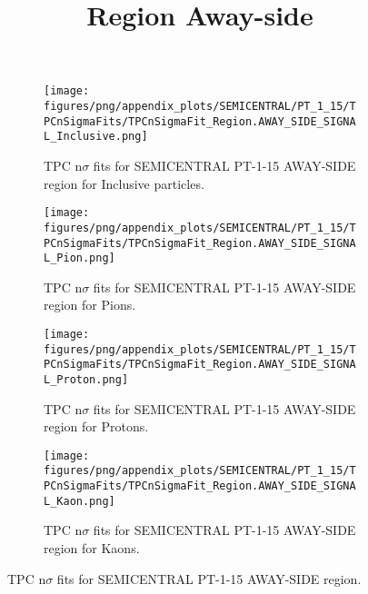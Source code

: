             \begin{figure}[H]
                \title{Region Away-side}
                \begin{subfigure}[b]{0.5\textwidth}
                    \centering
                    \texttt{[image: figures/png/appendix\_plots/SEMICENTRAL/PT\_1\_15/TPCnSigmaFits/TPCnSigmaFit\_Region.AWAY\_SIDE\_SIGNAL\_Inclusive.png]}
                    \caption{TPC n$\sigma$ fits for SEMICENTRAL PT-1-15 AWAY-SIDE region for Inclusive particles.}
                    \label{fig:appendix_SEMICENTRAL_PT-1-15_AWAY_SIDE_SIGNAL_Inclusive}
                \end{subfigure}
                \begin{subfigure}[b]{0.5\textwidth}
                    \centering
                    \texttt{[image: figures/png/appendix\_plots/SEMICENTRAL/PT\_1\_15/TPCnSigmaFits/TPCnSigmaFit\_Region.AWAY\_SIDE\_SIGNAL\_Pion.png]}
                    \caption{TPC n$\sigma$ fits for SEMICENTRAL PT-1-15 AWAY-SIDE region for Pions.}
                    \label{fig:appendix_SEMICENTRAL_PT-1-15_AWAY_SIDE_SIGNAL_Pion}
                \end{subfigure}
                \begin{subfigure}[b]{0.5\textwidth}
                    \centering
                    \texttt{[image: figures/png/appendix\_plots/SEMICENTRAL/PT\_1\_15/TPCnSigmaFits/TPCnSigmaFit\_Region.AWAY\_SIDE\_SIGNAL\_Proton.png]}
                    \caption{TPC n$\sigma$ fits for SEMICENTRAL PT-1-15 AWAY-SIDE region for Protons.}
                    \label{fig:appendix_SEMICENTRAL_PT-1-15_AWAY_SIDE_SIGNAL_Proton}
                \end{subfigure}
                \begin{subfigure}[b]{0.5\textwidth}
                    \centering
                    \texttt{[image: figures/png/appendix\_plots/SEMICENTRAL/PT\_1\_15/TPCnSigmaFits/TPCnSigmaFit\_Region.AWAY\_SIDE\_SIGNAL\_Kaon.png]}
                    \caption{TPC n$\sigma$ fits for SEMICENTRAL PT-1-15 AWAY-SIDE region for Kaons.}
                    \label{fig:appendix_SEMICENTRAL_PT-1-15_AWAY_SIDE_SIGNAL_Kaon}
                \end{subfigure}
                \caption{TPC n$\sigma$ fits for SEMICENTRAL PT-1-15 AWAY-SIDE region.}
                \label{fig:appendix_SEMICENTRAL_PT-1-15_AWAY_SIDE_SIGNAL}
            \end{figure}
